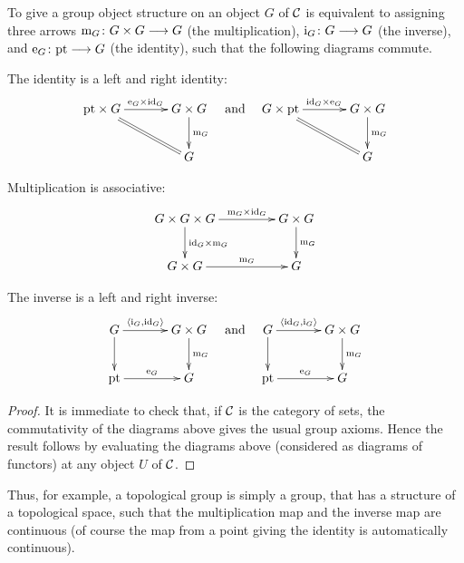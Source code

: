 \begin{2   CONTRAVARIANT FUNCTORS}
\begin{2.2 Group objects}
\begin{proposition}%
To give a group object structure on an object $G$ of $\mathcal{C}$ is equivalent to assigning three arrows $\mul_G \colon G \times G \arr G$ (the multiplication), $\inv_G \colon G \arr G$ (the inverse), and $\iden_G \colon \pt \arr G$ (the identity), such that the following diagrams commute.

\begin{enumeratei}

\item The identity is a left and right identity:
   \[
   \xymatrix@C+10pt{
   {}\pt \times G \ar[r]^{\iden_G \times \id_G}\ar@{=}[rd]&
			G \times G\ar[d]^{\mul_G}\\
			&G
   }
\quad\text{and}\quad
   \xymatrix@C+10pt{
   G \times \pt \ar[r]^{\id_G \times\iden_G}\ar@{=}[rd]&
			G \times G\ar[d]^{\mul_G}\\
			&G
   }
   \]

\item Multiplication is associative:
   \[
   \xymatrix@C+20pt{
   G \times G \times G\ar[r]^-{\mul_G \times \id_G}
			\ar[d]^{\id_G \times \mul_G} &
			G \times G\ar[d]^{\mul_G}\\
   G \times G\ar[r]^-{\mul_G} &
			G
   }
   \]

\item The inverse is a left and right inverse:
   \[
   \xymatrix@C+10pt{
   G\ar[r]^-{\generate{\inv_G,\id_G}}\ar[d] &
			G \times G\ar[d]^{\mul_G}\\
			{}\pt \ar[r]^-{\iden_G}&
   G}
   \quad\text{and}\quad
   \xymatrix@C+10pt{
   G\ar[r]^-{\generate{\id_G, \inv_G}}\ar[d] &
			G \times G\ar[d]^{\mul_G}\\
			{}\pt \ar[r]^-{\iden_G}&
   G}
   \]
\end{enumeratei}
\end{proposition}

\begin{proof}
It is immediate to check that, if $\mathcal{C}$ is the category of sets, the commutativity of the diagrams above gives the usual group axioms. Hence the result follows by evaluating the diagrams above (considered as diagrams of functors) at any object $U$ of $\mathcal{C}$.
\end{proof}


Thus, for example, a topological group is simply a group, that has a structure of a topological space, such that the multiplication map and the inverse map are continuous (of course the map from a point giving the identity is automatically continuous).


\end{2.2 Group objects}
\end{2   CONTRAVARIANT FUNCTORS}

